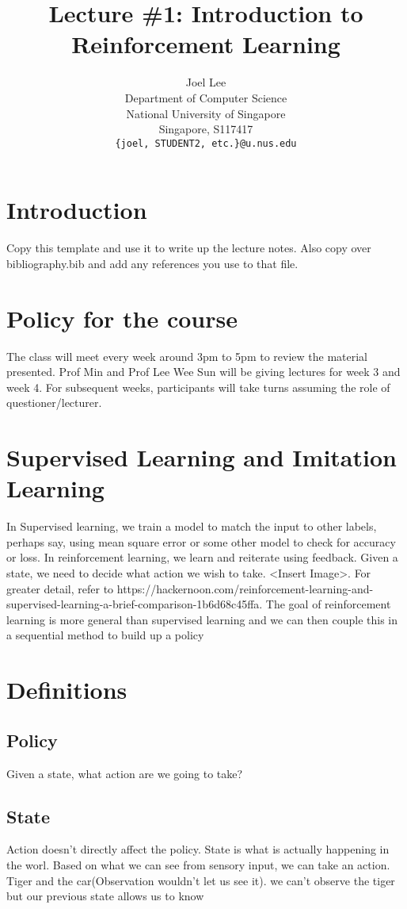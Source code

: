 \documentclass{article}
\title{Lecture \#1: Introduction to Reinforcement Learning}
\author{
  Joel Lee\\
  Department of Computer Science\\
  National University of Singapore\\
  Singapore, S117417 \\
  \texttt{\{joel, STUDENT2, etc.\}@u.nus.edu} \\
}
\begin{document}
\maketitle


\section{Introduction}
Copy this template and use it to write up the lecture notes. Also copy over
bibliography.bib and add any references you use to that file.
\section{Policy for the course}
The class will meet every week around 3pm to 5pm to review the material presented. Prof Min and Prof Lee Wee Sun will be giving lectures for week 3
and week 4. For subsequent weeks, participants will take turns assuming the role of questioner/lecturer. 



\section{Supervised Learning and Imitation Learning}
In Supervised learning, we train a model to match the input to other labels, perhaps say, using mean square error or some other model to check for accuracy or loss. In reinforcement learning, we learn and reiterate using feedback. Given a state, we need to decide what action we wish to take. <Insert Image>. For greater detail, refer to https://hackernoon.com/reinforcement-learning-and-supervised-learning-a-brief-comparison-1b6d68c45ffa. The goal of reinforcement learning is more general than supervised learning and we can then couple this in a sequential method to build up a policy

\section{Definitions}
\subsection{Policy}
Given a state, what action are we going to take?

\subsection{State}
Action doesn't directly affect the policy. State is what is actually happening in the worl.  Based on what we can see from sensory input, we can take an action.  Tiger and the car(Observation wouldn't let us see it). we can't observe the tiger but our previous state allows us to know
\end{document}
